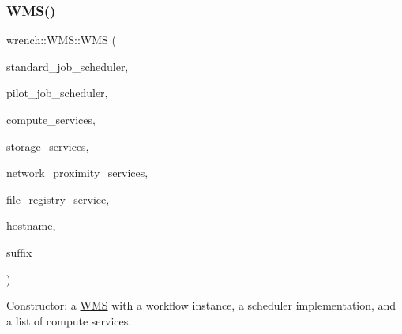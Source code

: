 \subsubsection{\texorpdfstring{W\+M\+S()}{WMS()}}
{\footnotesize\ttfamily wrench\+::\+W\+M\+S\+::\+W\+MS (\begin{DoxyParamCaption}\item[{std\+::unique\+\_\+ptr$<$ \hyperlink{classwrench_1_1_standard_job_scheduler}{Standard\+Job\+Scheduler} $>$}]{standard\+\_\+job\+\_\+scheduler,  }\item[{std\+::unique\+\_\+ptr$<$ \hyperlink{classwrench_1_1_pilot_job_scheduler}{Pilot\+Job\+Scheduler} $>$}]{pilot\+\_\+job\+\_\+scheduler,  }\item[{const std\+::set$<$ \hyperlink{classwrench_1_1_compute_service}{Compute\+Service} $\ast$$>$ \&}]{compute\+\_\+services,  }\item[{const std\+::set$<$ \hyperlink{classwrench_1_1_storage_service}{Storage\+Service} $\ast$$>$ \&}]{storage\+\_\+services,  }\item[{const std\+::set$<$ \hyperlink{classwrench_1_1_network_proximity_service}{Network\+Proximity\+Service} $\ast$$>$ \&}]{network\+\_\+proximity\+\_\+services,  }\item[{\hyperlink{classwrench_1_1_file_registry_service}{File\+Registry\+Service} $\ast$}]{file\+\_\+registry\+\_\+service,  }\item[{const std\+::string \&}]{hostname,  }\item[{const std\+::string}]{suffix }\end{DoxyParamCaption})\hspace{0.3cm}{\ttfamily [protected]}}



Constructor\+: a \hyperlink{classwrench_1_1_w_m_s}{W\+MS} with a workflow instance, a scheduler implementation, and a list of compute services. 


